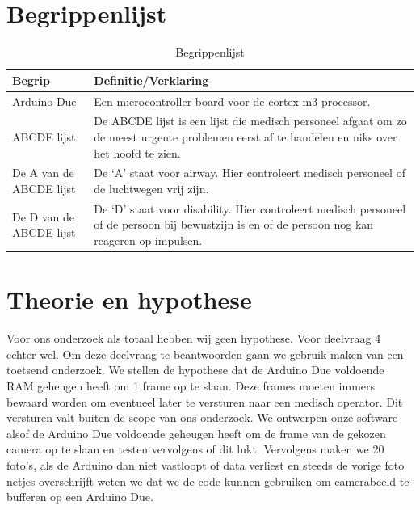 \documentclass{article}
\begin{document}
\begin{table}[H]
	\centering
	\section{Begrippenlijst}
	\begin{tabular}{ |p{2cm}|p{10cm}| } 
			
		\hline 
		\textbf{Begrip} 		& \textbf{Definitie/Verklaring} \\
		\hline
		\hline

		Arduino Due 			& Een microcontroller board voor de cortex-m3 processor. \\ 
		
		\hline

		ABCDE lijst 			& De ABCDE lijst is een lijst die medisch personeel afgaat om zo de meest urgente problemen eerst af te handelen en niks over het hoofd te zien. \\
		
		\hline
		
		De A van de ABCDE lijst & De ‘A’ staat voor airway. Hier controleert medisch personeel of de luchtwegen vrij zijn. \\
		
		\hline
		
		De D van de ABCDE lijst & De ‘D’ staat voor disability. Hier controleert medisch personeel of de persoon bij bewustzijn is en of de persoon nog kan reageren op impulsen. \\
		
		\hline
	 
		\end{tabular}
		\caption{Begrippenlijst}
		\label{table:1}
	\end{table}

\section{Theorie en hypothese}
Voor ons onderzoek als totaal hebben wij geen hypothese. Voor deelvraag 4 echter wel. Om deze deelvraag te beantwoorden gaan we gebruik maken van een toetsend onderzoek. We stellen de hypothese dat de Arduino Due voldoende RAM geheugen heeft om 1 frame op te slaan. Deze frames moeten immers bewaard worden om eventueel later te versturen naar een medisch operator. Dit versturen valt buiten de scope van ons onderzoek.
We ontwerpen onze software alsof de Arduino Due voldoende geheugen heeft om de frame van de gekozen camera op te slaan en testen vervolgens of dit lukt. Vervolgens maken we 20 foto’s, als de Arduino dan niet vastloopt of data verliest en steeds de vorige foto netjes overschrijft weten we dat we de code kunnen gebruiken om camerabeeld te bufferen op een Arduino Due. 
\end{document}
